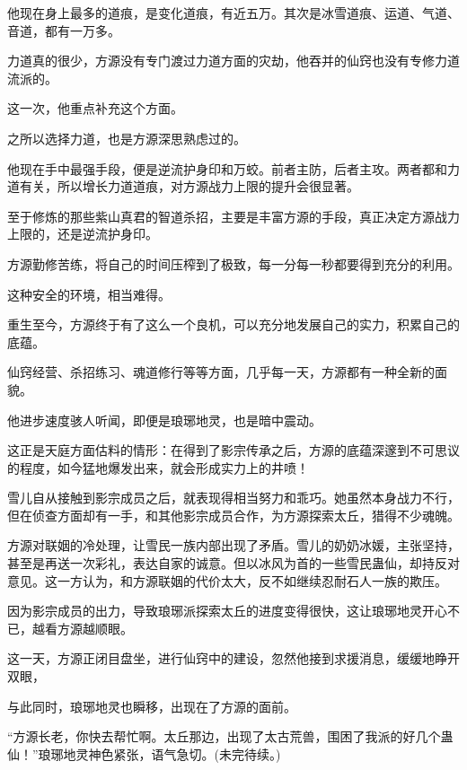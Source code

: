 \begin{this_body}
他现在身上最多的道痕，是变化道痕，有近五万。其次是冰雪道痕、运道、气道、音道，都有一万多。

力道真的很少，方源没有专门渡过力道方面的灾劫，他吞并的仙窍也没有专修力道流派的。

这一次，他重点补充这个方面。

之所以选择力道，也是方源深思熟虑过的。

他现在手中最强手段，便是逆流护身印和万蛟。前者主防，后者主攻。两者都和力道有关，所以增长力道道痕，对方源战力上限的提升会很显著。

至于修炼的那些紫山真君的智道杀招，主要是丰富方源的手段，真正决定方源战力上限的，还是逆流护身印。

方源勤修苦练，将自己的时间压榨到了极致，每一分每一秒都要得到充分的利用。

这种安全的环境，相当难得。

重生至今，方源终于有了这么一个良机，可以充分地发展自己的实力，积累自己的底蕴。

仙窍经营、杀招练习、魂道修行等等方面，几乎每一天，方源都有一种全新的面貌。

他进步速度骇人听闻，即便是琅琊地灵，也是暗中震动。

这正是天庭方面估料的情形：在得到了影宗传承之后，方源的底蕴深邃到不可思议的程度，如今猛地爆发出来，就会形成实力上的井喷！

雪儿自从接触到影宗成员之后，就表现得相当努力和乖巧。她虽然本身战力不行，但在侦查方面却有一手，和其他影宗成员合作，为方源探索太丘，猎得不少魂魄。

方源对联姻的冷处理，让雪民一族内部出现了矛盾。雪儿的奶奶冰媛，主张坚持，甚至是再送一次彩礼，表达自家的诚意。但以冰风为首的一些雪民蛊仙，却持反对意见。这一方认为，和方源联姻的代价太大，反不如继续忍耐石人一族的欺压。

因为影宗成员的出力，导致琅琊派探索太丘的进度变得很快，这让琅琊地灵开心不已，越看方源越顺眼。

这一天，方源正闭目盘坐，进行仙窍中的建设，忽然他接到求援消息，缓缓地睁开双眼，

与此同时，琅琊地灵也瞬移，出现在了方源的面前。

“方源长老，你快去帮忙啊。太丘那边，出现了太古荒兽，围困了我派的好几个蛊仙！”琅琊地灵神色紧张，语气急切。(未完待续。)

\end{this_body}

